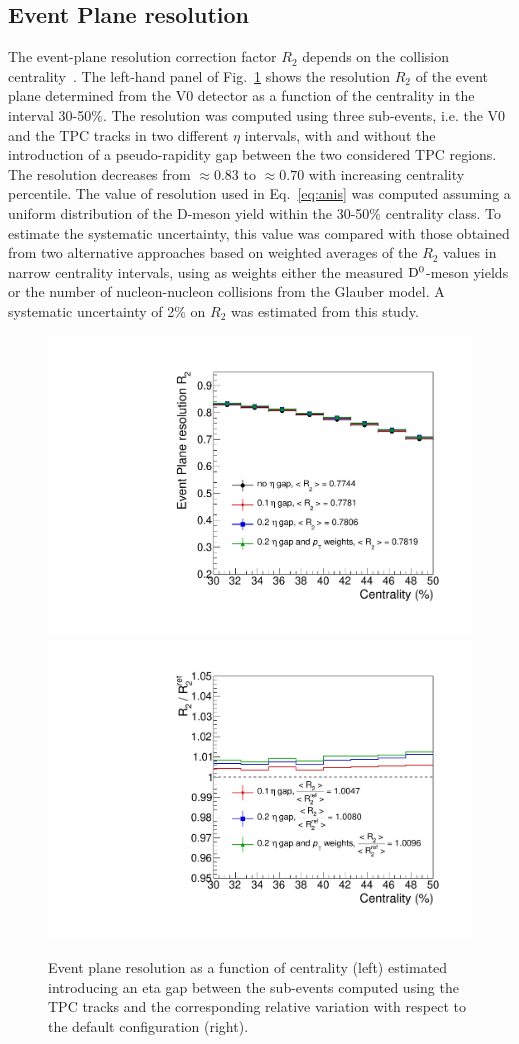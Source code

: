 \subsection{Event Plane resolution}
\label{sec:EPreso}
The event-plane resolution correction factor $R_2$ depends on the 
collision centrality~\cite{Abelev:2014ipa}. The left-hand panel of Fig.~\ref{fig:EtaGapSyst} shows
the resolution $R_2$ of the event plane determined from the V0 detector as a function of the centrality in the interval
30-50\%. The resolution was computed using three sub-events, i.e. the
V0 and the TPC tracks in two different $\eta$ intervals,
with and without the introduction of a 
pseudo-rapidity gap between the two considered TPC regions.
The resolution decreases from $\approx 0.83$ to $\approx 0.70$ with increasing centrality
percentile.
The value of resolution used in Eq.~\ref{eq:anis} was computed
 assuming a uniform distribution of the D-meson yield within 
 the 30-50\% centrality class.
 To estimate the systematic uncertainty, this value was 
 compared with those obtained from two alternative approaches
based on weighted averages of the $R_2$ values in narrow centrality 
intervals, using as weights either the measured ${\rm D^0}$-meson yields or the number of 
nucleon-nucleon collisions from the Glauber model. 
A systematic uncertainty of 2\% on $R_2$ was estimated from 
this study.
\begin{figure}
\centering
  \includegraphics[width=.49\textwidth]{FigCap5/EPresolution_VZERO_NonFlowSyst.pdf}
  \includegraphics[width=.49\textwidth]{FigCap5/EPresolution_VZERO_NonFlowSyst_ratio.pdf}
\caption{Event plane resolution as a function of centrality (left) estimated introducing an eta gap between the sub-events computed using the TPC tracks and the corresponding relative variation with respect to the default configuration (right).}
\label{fig:EtaGapSyst}
\end{figure}

